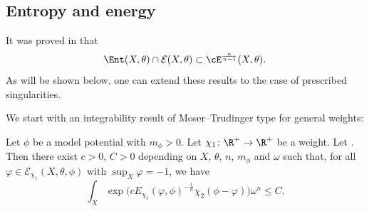 \subsection{Entropy and energy}
It was proved in \cite{DGL20, DNL21} that \[\Ent(X,\theta)\cap \mathcal{E}(X,\theta) \subset \cE^{\frac{n}{n-1}}(X,\theta).\] As will be shown below, one can extend these results to the case of prescribed singularities.

We start with an integrability result of Moser--Trudinger type for general weights:

\begin{Theorem}
 	\label{thm: rel Moser--Trudinger inequality weight}
 	Let $\phi$ be a model potential with $m_\phi>0$. Let $\chi_1\colon \R^+\rightarrow \R^+ $ be a weight. Let . Then there exist $c>0$, $C>0$ depending on $X$, $\theta$, $n$, $m_\phi$ and $\omega$ such that, for all $\varphi\in \mathcal{E}_{\chi_1}(X,\theta, \phi)$ with $\sup_X \varphi=-1$, we have
 	\begin{equation}
 	\int_X \exp \big( c E_{\chi_1}(\varphi, \phi)^{-\frac{1}{n}} \chi_2(\phi-\varphi)\big)\omega^n \leq C.
 	\label{eq: Moser} \end{equation}
 \end{Theorem}

